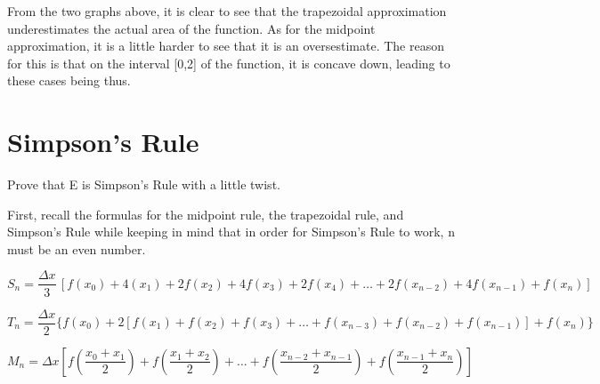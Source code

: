 \documentclass[letterpaper,12pt]{article}
\theoremstyle{definition}
\begin{document}
\vspace{1cm}

From the two graphs above, it is clear to see that the trapezoidal approximation underestimates the actual area of the function. As for the midpoint approximation, it is a little harder to see that it is an oversestimate. The reason for this is that on the interval [0,2] of the function, it is concave down, leading to these cases being thus.

\pagebreak

\section{Simpson's Rule}

\begin{large}
  Prove that E is Simpson's Rule with a little twist.
\end{large}

\vspace{1cm}

First, recall the formulas for the midpoint rule, the trapezoidal rule, and Simpson's Rule while keeping in mind that in order for Simpson's Rule to work, n must be an even number.

\vspace{1cm}

$S_n=\dfrac{\Delta x}{3}\, [f(x_0)+4(x_1)+2f(x_2)+4f(x_3)+2f(x_4)+\ldots+2f(x_{n-2})+4f(x_{n-1})+f(x_n)]$

\vspace{1cm}

$T_n=\dfrac{\Delta x}{2}\{ f(x_0)+2[f(x_1)+f(x_2)+f(x_3)+\ldots +f(x_{n-3})+f(x_{n-2})+f(x_{n-1})]+f(x_n)\}$

\vspace{1cm}

$M_n=\Delta x[f(\dfrac{x_0+x_1}{2})+f(\dfrac{x_1+x_2}{2})+\ldots +f(\dfrac{x_{n-2}+x_{n-1}}{2})+f(\dfrac{x_{n-1}+x_n}{2})]$
\end{document}

